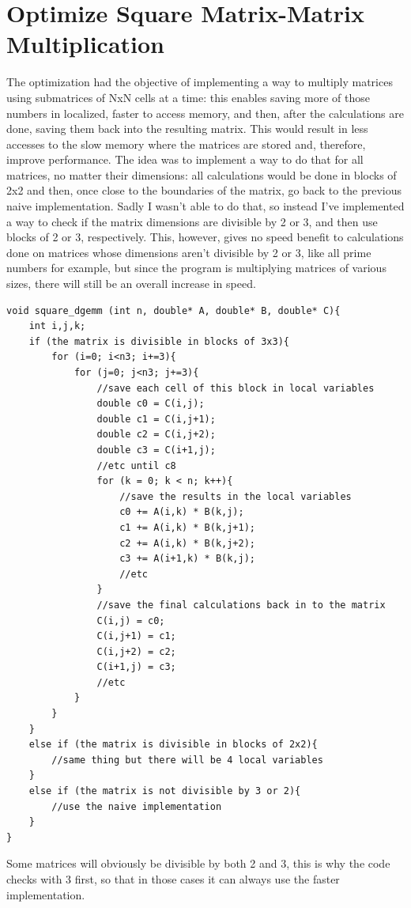 \documentclass[unicode,11pt,a4paper,oneside,numbers=endperiod,openany]{scrartcl}
\begin{document}
\section{Optimize Square Matrix-Matrix Multiplication  }
The optimization had the objective of implementing a way to multiply matrices using submatrices of NxN cells at a time: this enables saving more of those numbers in localized, faster to access memory, and then, after the calculations are done, saving them back into the resulting matrix.  This would result in less accesses to the slow memory where the matrices are stored and, therefore, improve performance.
\newline
The idea was to implement a way to do that for all matrices, no matter their dimensions: all calculations would be done in blocks of 2x2 and then, once close to the boundaries of the matrix, go back to the previous naive implementation. Sadly I wasn't able to do that, so instead I've implemented a way to check if the matrix dimensions are divisible by 2 or 3, and then use blocks of 2 or 3, respectively.
\newline
This, however, gives no speed benefit to calculations done on matrices whose dimensions aren't divisible by 2 or 3, like all prime numbers for example, but since the program is multiplying matrices of various sizes, there will still be an overall increase in speed.
\begin{lstlisting}
void square_dgemm (int n, double* A, double* B, double* C){
	int i,j,k;
	if (the matrix is divisible in blocks of 3x3){
		for (i=0; i<n3; i+=3){
			for (j=0; j<n3; j+=3){
				//save each cell of this block in local variables
				double c0 = C(i,j);
				double c1 = C(i,j+1);
				double c2 = C(i,j+2);
				double c3 = C(i+1,j);
				//etc until c8
				for (k = 0; k < n; k++){
					//save the results in the local variables
					c0 += A(i,k) * B(k,j);
					c1 += A(i,k) * B(k,j+1);
					c2 += A(i,k) * B(k,j+2);
					c3 += A(i+1,k) * B(k,j);
					//etc
				}
				//save the final calculations back in to the matrix
				C(i,j) = c0;
				C(i,j+1) = c1;
				C(i,j+2) = c2;
				C(i+1,j) = c3;
				//etc
			}
		}
	}
	else if (the matrix is divisible in blocks of 2x2){
		//same thing but there will be 4 local variables
	}
	else if (the matrix is not divisible by 3 or 2){
		//use the naive implementation
	}
}
\end{lstlisting}
Some matrices will obviously be divisible by both 2 and 3, this is why the code checks with 3 first, so that in those cases it can always use the faster implementation.
\newline
\end{document}
